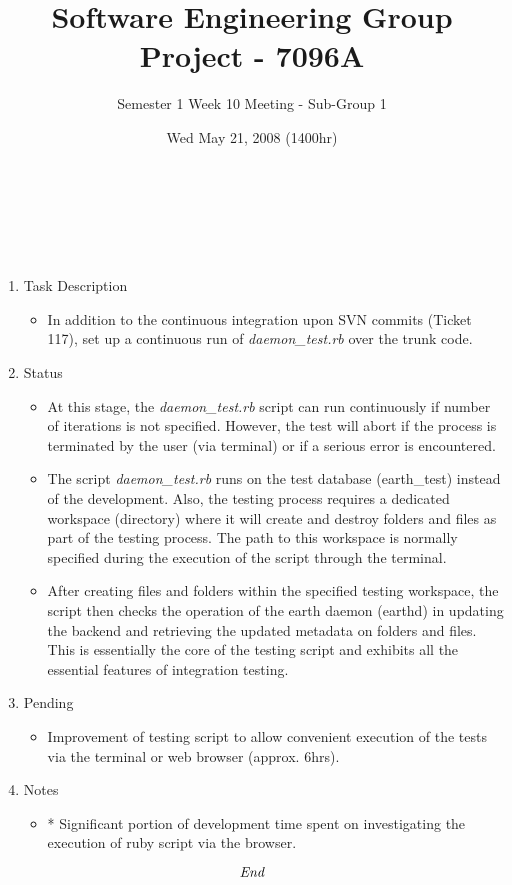 \documentclass[10pt, a4]{article}
\begin{document}
\title{Software Engineering Group Project - 7096A}
\author{Semester 1 Week 10 Meeting - Sub-Group 1}
\date{Wed May 21, 2008 (1400hr)}

\maketitle 

\\
\\
\\
\begin{enumerate}
\item {Task Description}
  \begin{itemize}
  \item In addition to the continuous integration upon SVN commits (Ticket 117), set up a continuous run of \emph{daemon\_test.rb} over the trunk code.
  \end{itemize}
\item {Status}
  \begin{itemize}
  \item At this stage, the \emph{daemon\_test.rb} script can run continuously if number of iterations is not specified. However, the test will abort if the process is terminated by the user (via terminal) or if a serious error is encountered.
  \item The script \emph{daemon\_test.rb} runs on the test database (earth\_test) instead of the development. Also, the testing process requires a dedicated workspace (directory) where it will create and destroy folders and files as part of the testing process. The path to this workspace is normally specified during the execution of the script through the terminal.
  \item After creating files and folders within the specified testing workspace, the script then checks the operation of the earth daemon (earthd) in updating the backend and retrieving the updated metadata on folders and files. This is essentially the core of the testing script and exhibits all the essential features of integration testing.
  \end{itemize}
\item {Pending}
  \begin{itemize}
  \item Improvement of testing script to allow convenient execution of the tests via the terminal or web browser (approx. 6hrs).
  \end{itemize}
\item {Notes}
  \begin{itemize}
  \item * Significant portion of development time spent on investigating the execution of ruby script via the browser.
  \end{itemize}
\end{enumerate}

\[\emph{End}\]
\end{document}
